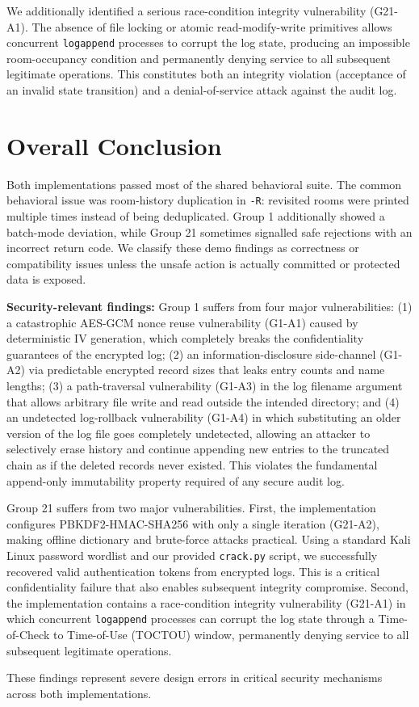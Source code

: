 \documentclass[a4paper, 12pt]{article}
\begin{document}
    We additionally identified a serious race-condition integrity vulnerability (G21-A1). The absence of file locking or atomic read-modify-write primitives allows concurrent \texttt{logappend} processes to corrupt the log state, producing an impossible room-occupancy condition and permanently denying service to all subsequent legitimate operations. This constitutes both an integrity violation (acceptance of an invalid state transition) and a denial-of-service attack against the audit log.

    \section{Overall Conclusion}
    Both implementations passed most of the shared behavioral suite. The common behavioral issue was room-history duplication in \texttt{-R}: revisited rooms were printed multiple times instead of being deduplicated. Group 1 additionally showed a batch-mode deviation, while Group 21 sometimes signalled safe rejections with an incorrect return code. We classify these demo findings as correctness or compatibility issues unless the unsafe action is actually committed or protected data is exposed.

    \textbf{Security-relevant findings:} Group 1 suffers from four major vulnerabilities: (1) a catastrophic AES-GCM nonce reuse vulnerability (G1-A1) caused by deterministic IV generation, which completely breaks the confidentiality guarantees of the encrypted log; (2) an information-disclosure side-channel (G1-A2) via predictable encrypted record sizes that leaks entry counts and name lengths; (3) a path-traversal vulnerability (G1-A3) in the log filename argument that allows arbitrary file write and read outside the intended directory; and (4) an undetected log-rollback vulnerability (G1-A4) in which substituting an older version of the log file goes completely undetected, allowing an attacker to selectively erase history and continue appending new entries to the truncated chain as if the deleted records never existed. This violates the fundamental append-only immutability property required of any secure audit log.

    Group 21 suffers from two major vulnerabilities. First, the implementation configures PBKDF2-HMAC-SHA256 with only a single iteration (G21-A2), making offline dictionary and brute-force attacks practical. Using a standard Kali Linux password wordlist and our provided \texttt{crack.py} script, we successfully recovered valid authentication tokens from encrypted logs. This is a critical confidentiality failure that also enables subsequent integrity compromise. Second, the implementation contains a race-condition integrity vulnerability (G21-A1) in which concurrent \texttt{logappend} processes can corrupt the log state through a Time-of-Check to Time-of-Use (TOCTOU) window, permanently denying service to all subsequent legitimate operations.

    These findings represent severe design errors in critical security mechanisms across both implementations.
\end{document}
